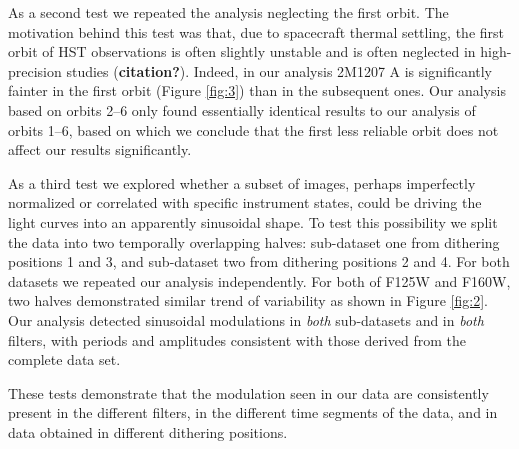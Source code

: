 \documentclass[apj]{emulateapj}
\begin{document}
As a second test we repeated the analysis neglecting the first orbit. The motivation behind this test was that, due to spacecraft thermal settling, the first orbit of HST observations
 is often slightly unstable and is often neglected in high-precision studies (\textbf{citation?}). Indeed, in our analysis 2M1207 A is significantly fainter in the first orbit (Figure \ref{fig:3}) than in the subsequent ones. 
Our analysis based on orbits 2--6 only found essentially identical results to our analysis of orbits 1--6, based on which we conclude that the first less reliable orbit does not affect our results significantly.

As a third test we explored whether a subset of images, perhaps imperfectly normalized or correlated with specific instrument states, could be driving the light curves into an apparently sinusoidal shape. To test this possibility we split the data into two temporally overlapping halves: sub-dataset one from dithering positions 1 and 3, and sub-dataset two from dithering positions 2 and 4. For both datasets we repeated our analysis independently. 
For both of F125W and F160W, two halves demonstrated similar trend of
 variability as shown in Figure \ref{fig:2}.
 Our analysis detected sinusoidal modulations in {\em both} sub-datasets and in {\em both} filters, with periods and amplitudes consistent with those derived from the complete data set. 
 
 These tests demonstrate that the modulation seen in our data are consistently present in the different filters, in the different time segments of the data, and in data obtained in different dithering positions. 
\end{document}
